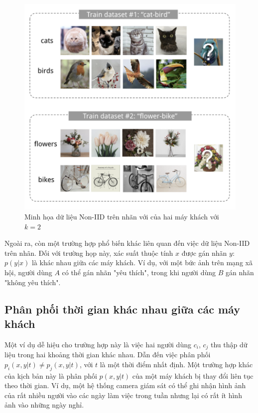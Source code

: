 \begin{figure}
    \centering
    \includegraphics[scale=0.7]{../images/noniid_label.png}
    \caption{Minh họa dữ liệu Non-IID trên nhãn với của hai máy khách với $k=2$}
    \label{fig:my_noniid}
\end{figure}

Ngoài ra, còn một trường hợp phổ biến khác liên quan đến việc dữ liệu Non-IID trên nhãn. Đối với trường họp này, xác suất thuộc tính $x$ được gán nhãn $y$: $p(y|x)$ là khác nhau giữa các máy khách. Ví dụ, với một bức ảnh trên mạng xã hội, người dùng $A$ có thể gán nhãn "yêu thích", trong khi người dùng $B$ gán nhãn "không yêu thích".

\subsection{Phân phối thời gian khác nhau giữa các máy khách}

Một ví dụ dễ hiệu cho trường hợp này là việc hai người dùng $c_i$, $c_j$ thu thập dữ liệu trong hai khoảng thời gian khác nhau. Dẫn đến việc phân phối $p_i(x, y|t) \ne p_j(x, y|t)$, với $t$ là một thời điểm nhất định. Một trường hợp khác của kịch bản này là phân phối $p(x, y|t)$ của một máy khách bị thay đổi liên tục theo thời gian. Ví dụ, một hệ thống camera giám sát có thể ghi nhận hình ảnh của rất nhiều người vào các ngày làm việc trong tuần nhưng lại có rất ít hình ảnh vào những ngày nghỉ.

